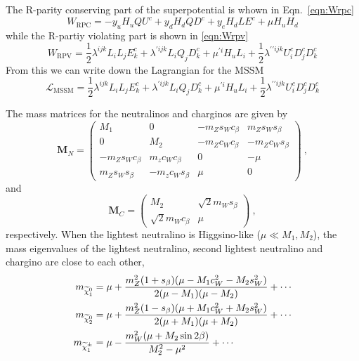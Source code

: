 The R-parity conserving part of the superpotential is whown in Eqn.~\ref{eqn:Wrpc}
\begin{equation}
W_{\mathrm{RPC}} = - y_u H_u Q U^c + y_dH_d Q D^c + y_e H_d L E^c +
\mu H_uH_d
\label{eqn:Wrpc}
\end{equation}
while the R-partiy violating part is shown in \ref{eqn:Wrpv}
\begin{equation}
W_{\mathrm{RPV}} =\frac{1}{2}\lambda^{ijk}L_iL_jE_k^c +
\lambda^{\prime ijk} L_iQ_jD_k^c + \mu^{\prime i}H_uL_i +
\frac{1}{2}\lambda^{\prime\prime ijk}U_i^cD_j^cD_k^c
\label{eqn:Wrpv}
\end{equation}
From this we can write down the Lagrangian for the MSSM
\begin{equation}
\mathcal L_{\mathrm{MSSM}}=\frac{1}{2}\lambda^{ijk}L_iL_jE_k^c +
\lambda^{\prime ijk} L_iQ_jD_k^c + \mu^{\prime i}H_uL_i +
\frac{1}{2}\lambda^{\prime\prime ijk}U_i^cD_j^cD_k^c
\label{eqn:Wrpv}
\end{equation}

The mass matrices for the neutralinos and charginos are given by
\begin{equation}
\mathbf{M}_N =\left (  \begin{matrix}
M_1 & 0 & -m_Zs_Wc_{\beta} & m_Zs_Ws_{\beta} \\
0& M_2 & -m_Zc_Wc_{\beta} & -m_Zc_Ws_{\beta} \\
-m_Zs_Wc_{\beta}& m_zc_Wc_{\beta} & 0 & -\mu\\
m_Zs_Ws_{\beta}& -m_zc_Ws_{\beta} & \mu & 0
\end{matrix}\right)~,
\end{equation}
and 
\begin{equation}
\mathbf{M}_C =\left (  \begin{matrix}
M_2 & \sqrt{2}m_Ws_{\beta}\\
 \sqrt{2}m_Wc_{\beta}& \mu
\end{matrix}\right)~,
\end{equation}
respectively. When the lightest neutralino is Higgsino-like ($\mu \ll M_1, M_2$), the
mass eigenvalues of the lightest neutralino, second lightest neutralino and chargino are close to
each other,
\begin{align}
m_{\widetilde{\chi}^{0}_1} &= \mu + \frac{m_Z^2(1+s_{\beta})(\mu - M_1c_W^2-M_2s_W^2)}{2(\mu-M_1)(\mu-M_2)} + \cdots\\
m_{\widetilde{\chi}^{0}_2} &= \mu + \frac{m_Z^2(1-s_{\beta})(\mu + M_1c_W^2+M_2s_W^2)}{2(\mu+M_1)(\mu+M_2)} + \cdots\\
m_{\widetilde{\chi}^{\pm}_1} &= \mu - \frac{m_W^2(\mu + M_2\sin 2\beta)}{M_2^2-\mu^2} + \cdots
\end{align}

